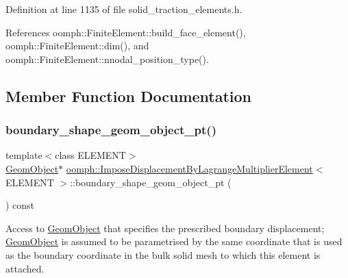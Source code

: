 Definition at line 1135 of file solid\+\_\+traction\+\_\+elements.\+h.



References oomph\+::\+Finite\+Element\+::build\+\_\+face\+\_\+element(), oomph\+::\+Finite\+Element\+::dim(), and oomph\+::\+Finite\+Element\+::nnodal\+\_\+position\+\_\+type().



\subsection{Member Function Documentation}
\mbox{\label{classoomph_1_1ImposeDisplacementByLagrangeMultiplierElement_aafddef9b676b780db8f48608f2a8e90d}} 
\subsubsection{\texorpdfstring{boundary\+\_\+shape\+\_\+geom\+\_\+object\+\_\+pt()}{boundary\_shape\_geom\_object\_pt()}}
{\footnotesize\ttfamily template$<$class E\+L\+E\+M\+E\+NT$>$ \\
\hyperlink{classoomph_1_1GeomObject}{Geom\+Object}$\ast$ \hyperlink{classoomph_1_1ImposeDisplacementByLagrangeMultiplierElement}{oomph\+::\+Impose\+Displacement\+By\+Lagrange\+Multiplier\+Element}$<$ E\+L\+E\+M\+E\+NT $>$\+::boundary\+\_\+shape\+\_\+geom\+\_\+object\+\_\+pt (\begin{DoxyParamCaption}{ }\end{DoxyParamCaption}) const\hspace{0.3cm}{\ttfamily [inline]}}



Access to \hyperlink{classoomph_1_1GeomObject}{Geom\+Object} that specifies the prescribed boundary displacement; \hyperlink{classoomph_1_1GeomObject}{Geom\+Object} is assumed to be parametrised by the same coordinate that is used as the boundary coordinate in the bulk solid mesh to which this element is attached. 



